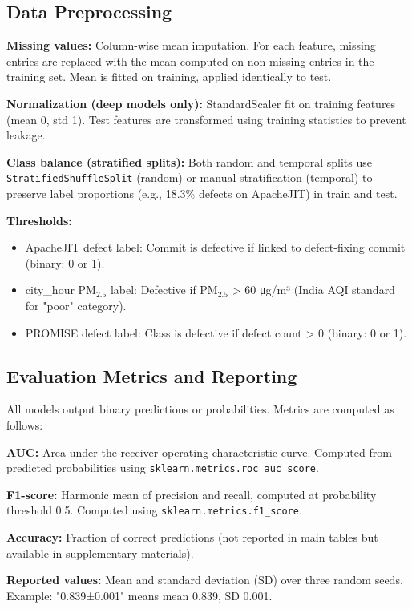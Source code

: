 \subsection{Data Preprocessing}

\textbf{Missing values:} Column-wise mean imputation. For each feature, missing entries are replaced with the mean computed on non-missing entries in the training set. Mean is fitted on training, applied identically to test.

\textbf{Normalization (deep models only):} StandardScaler fit on training features (mean 0, std 1). Test features are transformed using training statistics to prevent leakage.

\textbf{Class balance (stratified splits):} Both random and temporal splits use \texttt{StratifiedShuffleSplit} (random) or manual stratification (temporal) to preserve label proportions (e.g., 18.3\% defects on ApacheJIT) in train and test.

\textbf{Thresholds:}
\begin{itemize}
\item ApacheJIT defect label: Commit is defective if linked to defect-fixing commit (binary: 0 or 1).
\item city\_hour PM$_{2.5}$ label: Defective if PM$_{2.5}$ > 60 μg/m³ (India AQI standard for "poor" category).
\item PROMISE defect label: Class is defective if defect count > 0 (binary: 0 or 1).
\end{itemize}

\subsection{Evaluation Metrics and Reporting}

All models output binary predictions or probabilities. Metrics are computed as follows:

\textbf{AUC:} Area under the receiver operating characteristic curve. Computed from predicted probabilities using \texttt{sklearn.metrics.roc\_auc\_score}.

\textbf{F1-score:} Harmonic mean of precision and recall, computed at probability threshold 0.5. Computed using \texttt{sklearn.metrics.f1\_score}.

\textbf{Accuracy:} Fraction of correct predictions (not reported in main tables but available in supplementary materials).

\textbf{Reported values:} Mean and standard deviation (SD) over three random seeds. Example: "0.839±0.001" means mean 0.839, SD 0.001.


